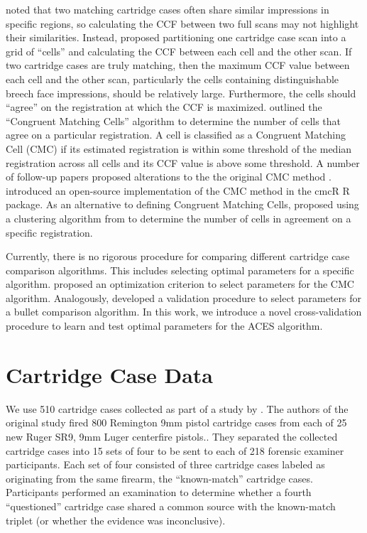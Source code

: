 \documentclass[11pt,]{isuthesis}
\begin{document}
\citet{song_proposed_2013} noted that two matching cartridge cases often share similar impressions in specific regions, so calculating the CCF between two full scans may not highlight their similarities.
Instead, \citet{song_proposed_2013} proposed partitioning one cartridge case scan into a grid of ``cells'' and calculating the CCF between each cell and the other scan.
If two cartridge cases are truly matching, then the maximum CCF value between each cell and the other scan, particularly the cells containing distinguishable breech face impressions, should be relatively large.
Furthermore, the cells should ``agree'' on the registration at which the CCF is maximized.
\citet{song_proposed_2013} outlined the ``Congruent Matching Cells'' algorithm to determine the number of cells that agree on a particular registration.
A cell is classified as a Congruent Matching Cell (CMC) if its estimated registration is within some threshold of the median registration across all cells and its CCF value is above some threshold.
A number of follow-up papers proposed alterations to the the original CMC method \citep{tong_improved_2015, chen_convergence_2017}.
\citet{cmcR} introduced an open-source implementation of the CMC method in the cmcR R package.
As an alternative to defining Congruent Matching Cells, \citet{Zhang2020} proposed using a clustering algorithm from \citet{Ester1996} to determine the number of cells in agreement on a specific registration.

Currently, there is no rigorous procedure for comparing different cartridge case comparison algorithms.
This includes selecting optimal parameters for a specific algorithm.
\citet{Zemmels2023} proposed an optimization criterion to select parameters for the CMC algorithm.
Analogously, \citet{hare_automatic_2016} developed a validation procedure to select parameters for a bullet comparison algorithm.
In this work, we introduce a novel cross-validation procedure to learn and test optimal parameters for the ACES algorithm.

\hypertarget{cartridge-case-data}{%
\section{Cartridge Case Data}\label{cartridge-case-data}}

We use 510 cartridge cases collected as part of a study by \citet{Baldwin2014}.
The authors of the original study fired 800 Remington 9mm pistol cartridge cases from each of 25 new Ruger SR9, 9mm Luger centerfire pistols..
They separated the collected cartridge cases into 15 sets of four to be sent to each of 218 forensic examiner participants.
Each set of four consisted of three cartridge cases labeled as originating from the same firearm, the ``known-match'' cartridge cases.
Participants performed an examination to determine whether a fourth ``questioned'' cartridge case shared a common source with the known-match triplet (or whether the evidence was inconclusive).
\end{document}
